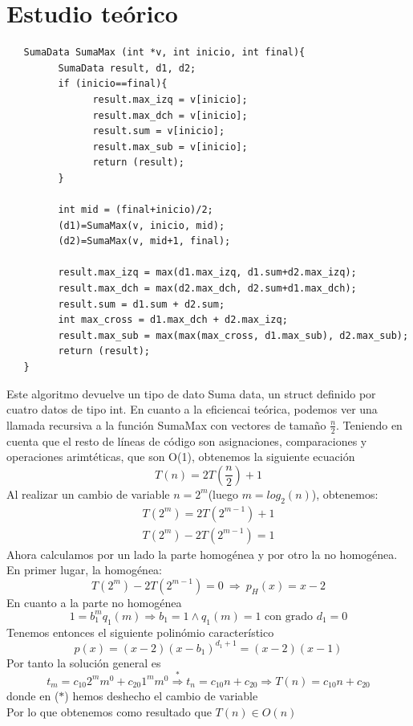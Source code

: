 \documentclass[11pt,openany]{book}
\begin{document}
\section*{Estudio teórico}
\begin{lstlisting}
   SumaData SumaMax (int *v, int inicio, int final){
         SumaData result, d1, d2;
         if (inicio==final){
               result.max_izq = v[inicio];
               result.max_dch = v[inicio];
               result.sum = v[inicio];
               result.max_sub = v[inicio];
               return (result);
         }

         int mid = (final+inicio)/2;
         (d1)=SumaMax(v, inicio, mid);
         (d2)=SumaMax(v, mid+1, final);
            
         result.max_izq = max(d1.max_izq, d1.sum+d2.max_izq);
         result.max_dch = max(d2.max_dch, d2.sum+d1.max_dch);
         result.sum = d1.sum + d2.sum;
         int max_cross = d1.max_dch + d2.max_izq;
         result.max_sub = max(max(max_cross, d1.max_sub), d2.max_sub);
         return (result);
   }
\end{lstlisting}
Este algoritmo devuelve un tipo de dato Suma data, un struct definido por cuatro datos de tipo int. En cuanto
a la eficiencai teórica, podemos ver una llamada recursiva a la función SumaMax con vectores de tamaño $\frac{n}{2}$. 
Teniendo en cuenta que el resto de líneas de código son asignaciones, comparaciones y operaciones arimtéticas, que son O(1), obtenemos 
la siguiente ecuación
\begin{equation*}
      T(n)=2T(\frac{n}{2})+1
\end{equation*}
Al realizar un cambio de variable $n=2^m$(luego $m=log_2(n)$), obtenemos:
\begin{gather*}
      T(2^m)=2T(2^{m-1})+1 \\
      T(2^m)-2T(2^{m-1})=1
\end{gather*}
Ahora calculamos por un lado la parte homogénea y por otro la no homogénea. En primer lugar, la homogénea:
\begin{equation*}
      T(2^m)-2T(2^{m-1})=0 \  \Longrightarrow  \ p_H(x)=x-2
\end{equation*}
En cuanto a la parte no homogénea
\begin{equation*}
      1=b_1^m q_1(m) \Longrightarrow b_1=1 \wedge q_1(m)=1 \text{ con grado } d_1=0
\end{equation*}
Tenemos entonces el siguiente polinómio característico
\begin{equation*}
    p(x)=(x-2)(x-b_1)^{d_1+1}=(x-2)(x-1)
\end{equation*}
Por tanto la solución general es
\begin{equation*}
    t_m=c_{10}2^mm^0+c_{20}1^mm^0  \overset{*}{\Longrightarrow}  t_n=c_{10}n+c_{20} \Longrightarrow T(n)=c_{10}n+c_{20}
\end{equation*}
donde en ($*$) hemos deshecho el cambio de variable \\
Por lo que obtenemos como resultado que $T(n) \in O(n)$
\end{document}
